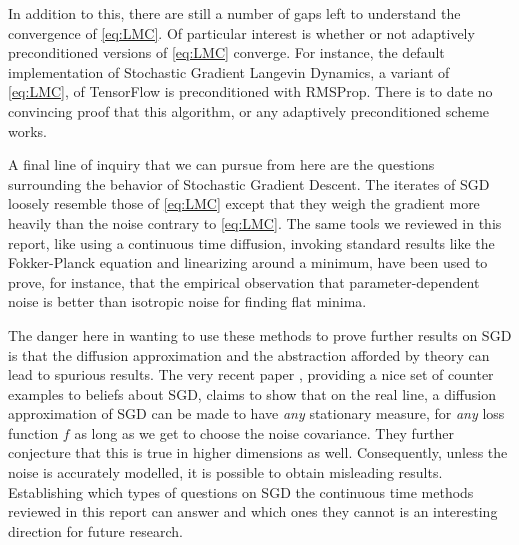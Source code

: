 \documentclass[10pt,journal,a4paper]{IEEEtran}
\theoremstyle{definition}
\begin{document}
In addition to this, there are still a number of gaps left to understand the convergence of \eqref{eq:LMC}. Of particular interest is whether or not adaptively preconditioned versions of \eqref{eq:LMC} converge. For instance, the default implementation of Stochastic Gradient Langevin Dynamics, a variant of \eqref{eq:LMC}, of TensorFlow is preconditioned with RMSProp. There is to date no convincing proof that this algorithm, or any adaptively preconditioned scheme works.  

A final line of inquiry that we can pursue from here are the questions surrounding the behavior of Stochastic Gradient Descent. The iterates of SGD loosely resemble those of \eqref{eq:LMC} except that they weigh the gradient more heavily than the noise contrary to \eqref{eq:LMC}. The same tools we reviewed in this report, like using a continuous time diffusion, invoking standard results like the Fokker-Planck equation and linearizing around a minimum, have been used to prove, for instance, that the empirical observation that parameter-dependent noise is better than isotropic noise for finding flat minima. 

The danger here in wanting to use these methods to prove further results on SGD is that the diffusion approximation and the abstraction afforded by theory can lead to spurious results. The very recent paper \cite{ziyin_sgd_2021}, providing a nice set of counter examples to beliefs about SGD, claims to show that on the real line, a diffusion approximation of SGD can be made to have \textit{any} stationary measure, for \textit{any} loss function $f$ as long as we get to choose the noise covariance. They further conjecture that this is true in higher dimensions as well. Consequently, unless the noise is accurately modelled, it is possible to obtain misleading results. Establishing which types of questions on SGD the continuous time methods reviewed in this report can answer and which ones they cannot is an interesting direction for future research. 


%
%
\end{document}
